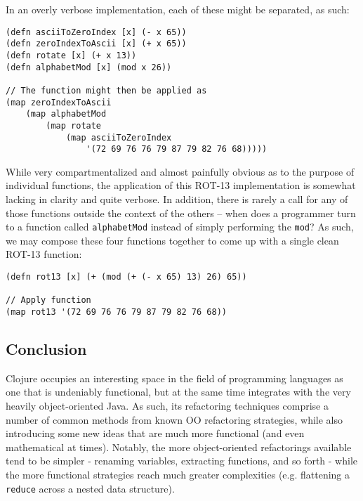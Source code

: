 In an overly verbose implementation, each of these might be separated, as such:

\begin{verbatim}
(defn asciiToZeroIndex [x] (- x 65))
(defn zeroIndexToAscii [x] (+ x 65))
(defn rotate [x] (+ x 13))
(defn alphabetMod [x] (mod x 26))

// The function might then be applied as
(map zeroIndexToAscii
    (map alphabetMod
        (map rotate
            (map asciiToZeroIndex 
                '(72 69 76 76 79 87 79 82 76 68)))))
\end{verbatim}

While very compartmentalized and almost painfully obvious as to the purpose of individual functions, the application of this ROT-13 implementation is somewhat lacking in clarity and quite verbose. In addition, there is rarely a call for any of those functions outside the context of the others -- when does a programmer turn to a function called \verb!alphabetMod! instead of simply performing the \verb!mod!? As such, we may compose these four functions together to come up with a single clean ROT-13 function:

\begin{verbatim}
(defn rot13 [x] (+ (mod (+ (- x 65) 13) 26) 65))

// Apply function
(map rot13 '(72 69 76 76 79 87 79 82 76 68))
\end{verbatim}

\subsection{Conclusion}

Clojure occupies an interesting space in the field of programming languages as one that is undeniably functional, but at the same time integrates with the very heavily object-oriented Java. As such, its refactoring techniques comprise a number of common methods from known OO refactoring strategies, while also introducing some new ideas that are much more functional (and even mathematical at times). Notably, the more object-oriented refactorings available tend to be simpler - renaming variables, extracting functions, and so forth - while the more functional strategies reach much greater complexities (e.g. flattening a \verb!reduce! across a nested data structure).
